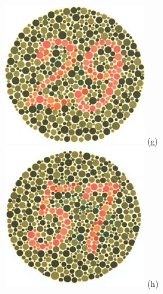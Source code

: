\documentclass[	12pt, Times, openright, twoside, a4paper, english, brazil]{abntex2}
\begin{document}
\begin{apendicesenv}
\begin{figure}[!htb]
\centering
{\includegraphics[width=\linewidth]{ishihara-transformacao/plate4.png}}
(g)
\endminipage\hfill
{}
\centering
{\includegraphics[width=\linewidth]{ishihara-transformacao/plate5.png}}
(h)
\endminipage\hfill



\end{figure}
\end{apendicesenv}
\end{document}
